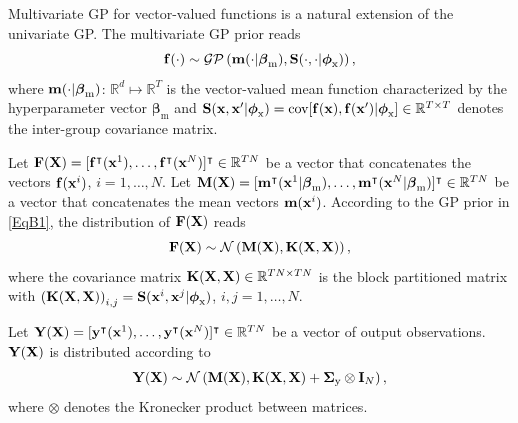 \documentclass[iicol,sn-basic]{sn-jnl}%
\begin{document}
\begin{appendices}
Multivariate GP for vector-valued functions is a natural extension of the univariate GP.
The multivariate GP prior reads
\begin{equation}\label{EqB1}
	{\bf f}(\cdot) \sim \mathcal{GP} \left({\bf m}(\cdot|\boldsymbol \beta_\text{m}),{\bf S}(\cdot,\cdot|\boldsymbol \phi_{\text{x}})\right),
\end{equation}
where ${\bf m}(\cdot|\boldsymbol \beta_\text{m})$: $\mathbb{R}^d \mapsto \mathbb{R}^T$ is the vector-valued mean function characterized by the hyperparameter vector $\boldsymbol \beta_\text{m}$ and
${\bf S}({\bf x},{\bf x}'|\boldsymbol \phi_{\text{x}}) = \text{cov}[{\bf f}({\bf x}),{\bf f}({\bf x}')|\boldsymbol \phi_{\text{x}}] \in \mathbb{R}^{T \times T}$ denotes the inter-group covariance matrix.

Let ${\bf F}({\bf X})=[{\bf f}^\intercal({\bf x}^1),\dots,{\bf f}^\intercal({\bf x}^N)]^\intercal \in \mathbb{R}^{TN}$ be a vector that concatenates the vectors ${\bf f}({\bf x}^i)$, $i=1,\dots,N$.
Let ${\bf M}({\bf X})=[{\bf m}^\intercal({\bf x}^1|\boldsymbol \beta_\text{m}),\dots,{\bf m}^\intercal({\bf x}^N|\boldsymbol \beta_\text{m})]^\intercal \in \mathbb{R}^{TN}$ be a vector that concatenates the mean vectors ${\bf m}({\bf x}^i)$.
According to the GP prior in \cref{EqB1}, the distribution of ${\bf F}({\bf X})$ reads 
\begin{equation}\label{EqB2}
	{\bf F}({\bf X}) \sim \mathcal{N} \left({\bf M}({\bf X}),{\bf K}({\bf X},{\bf X})\right),
\end{equation}
where the covariance matrix
${\bf K}({\bf X}, {\bf X}) \in \mathbb{R}^{TN \times TN}$ is the block partitioned matrix with
$\left({\bf K}({\bf X}, {\bf X})\right)_{i,j} = {\bf S}({\bf x}^i,{\bf x}^j|\boldsymbol \phi_{\text{x}})$, $i,j=1,\dots,N$.

Let ${\bf Y}({\bf X})=[{\bf y}^\intercal({\bf x}^1),\dots,{\bf y}^\intercal({\bf x}^N)]^\intercal \in \mathbb{R}^{TN}$ be a vector of output observations.
${\bf Y}({\bf X})$ is distributed according to
\begin{equation}\label{EqB3}
	{\bf Y}({\bf X}) \sim \mathcal{N} \left({\bf M}({\bf X}),{\bf K}({\bf X},{\bf X})+\boldsymbol{\Sigma}_\text{y} \otimes {\bf I}_N\right),
\end{equation}
where $\otimes$ denotes the Kronecker product between matrices.


\end{appendices}
\end{document}
